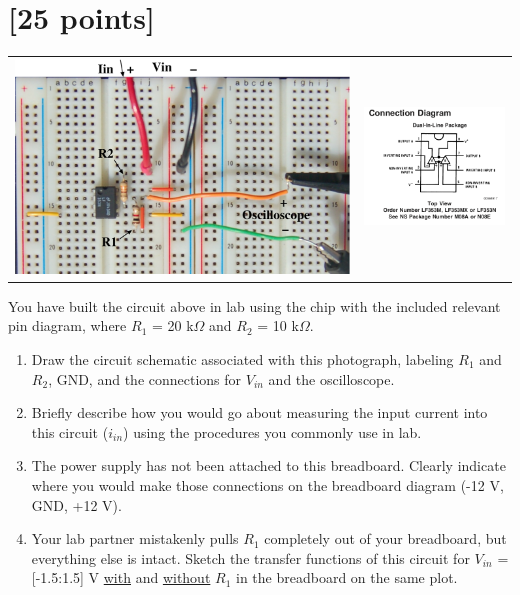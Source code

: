 

\section{[25 points]}

\begin{tabular}{cc}
\centering
\includegraphics[width=0.6\linewidth]{breadboard_ckt_labeled} &
\includegraphics[width=0.4\linewidth]{LF353_Connection_Diagram} \\
\end{tabular}

You have built the circuit above in lab using the chip with the included relevant pin diagram, where $R_1$ = 20 k$\Omega$ and $R_2$ = 10 k$\Omega$.  

\begin{enumerate}
\item Draw the circuit schematic associated with this photograph, labeling $R_1$ and $R_2$, GND, and the connections for $V_{in}$ and the oscilloscope.
\item Briefly describe how you would go about measuring the input current into
this circuit ($i_{in}$) using the procedures you commonly use in lab.
\item The power supply has not been attached to this breadboard.  Clearly
indicate where you would make those connections on the breadboard diagram (-12
V, GND, +12 V).
\item Your lab partner mistakenly pulls $R_1$ completely out of your
breadboard, but everything else is intact.  Sketch the transfer functions of
this circuit for $V_{in}$ = [-1.5:1.5] V \underline{with} and
\underline{without} $R_1$ in the breadboard on the same plot.
\end{enumerate}

\clearpage



\clearpage
